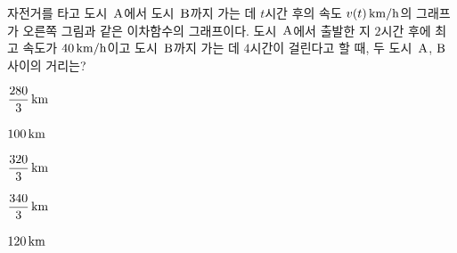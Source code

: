 \noindent\begin{minipage}[t]{0.58\linewidth}\vspace{0pt}\raggedright 자전거를 타고 도시~$\mathrm{A}$에서 도시~$\mathrm{B}$까지 가는 데 $t$시간 후의 속도 $v(t)\mkern3mu \mathrm{km/h}$의 그래프가 오른쪽 그림과 같은 이차함수의 그래프이다. 도시~$\mathrm{A}$에서 출발한 지 $2$시간 후에 최고 속도가 $40\mkern3mu \mathrm{km/h}$이고 도시~$\mathrm{B}$까지 가는 데 $4$시간이 걸린다고 할 때, 두 도시~$\mathrm{A}$, $\mathrm{B}$ 사이의 거리는? \end{minipage}\hfill\begin{minipage}[t]{0.4\linewidth}\vspace{0pt}\centering \resizebox{\ifdim\width>\linewidth\linewidth\else\width\fi}{!}{}\end{minipage}\par
\begin{choices32}{\rule[-3ex]{0pt}{8ex}$\dfrac{280}{3}\mkern3mu \mathrm{km}$}{\rule[-3ex]{0pt}{8ex}$100\mkern3mu \mathrm{km}$}{\rule[-3ex]{0pt}{8ex}$\dfrac{320}{3}\mkern3mu \mathrm{km}$}{\rule[-3ex]{0pt}{8ex}$\dfrac{340}{3}\mkern3mu \mathrm{km}$}{\rule[-3ex]{0pt}{8ex}$120\mkern3mu \mathrm{km}$}\end{choices32}

